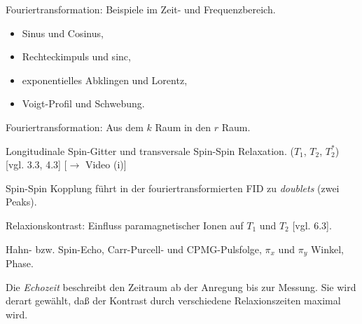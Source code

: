 \documentclass{subfiles}
\begin{document}
    \begin{Frage}
        Fouriertransformation: Beispiele im Zeit- und Frequenzbereich.
        \begin{itemize}[label=$\to$]
            \item Sinus und Cosinus,
            \item Rechteckimpuls und sinc,
            \item exponentielles Abklingen und Lorentz,
            \item Voigt-Profil und Schwebung.
        \end{itemize}
    \end{Frage}
    \begin{Antwort}
        
    \end{Antwort}

    \begin{Frage}
        Fouriertransformation: Aus dem $k$ Raum in den $r$ Raum. 
    \end{Frage}
    \begin{Antwort}
        
    \end{Antwort}

    \begin{Frage}
        Longitudinale Spin-Gitter und transversale Spin-Spin Relaxation. ($T_1$, $T_2$, $T_2^*$) [vgl. 3.3, 4.3] [$\to$ Video (i)]
    \end{Frage}
    \begin{Antwort}
        

        Spin-Spin Kopplung führt in der fouriertransformierten FID zu \emph{doublets} (zwei Peaks). 
    \end{Antwort}

    \begin{Frage}
        Relaxionskontrast: Einfluss paramagnetischer Ionen auf $T_1$ und $T_2$ [vgl. 6.3].
    \end{Frage}
    \begin{Antwort}
        
    \end{Antwort}

    \begin{Frage}
        Hahn- bzw. Spin-Echo, Carr-Purcell- und CPMG-Pulsfolge, $\pi_x$ und $\pi_y$ Winkel, Phase.
    \end{Frage}
    \begin{Antwort}
        Die \emph{Echozeit} beschreibt den Zeitraum ab der Anregung bis zur Messung. Sie wird derart gewählt, daß der Kontrast durch verschiedene Relaxionszeiten maximal wird. 
    \end{Antwort}
\end{document}
